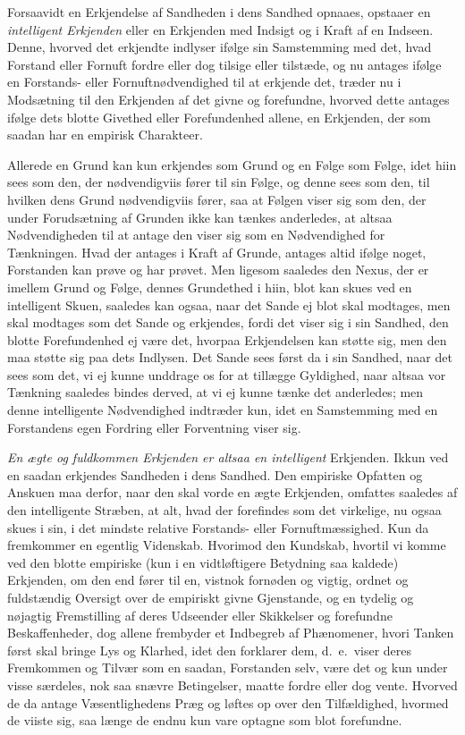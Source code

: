 \documentclass[12pt,a4paper]{book}
\newcommand{\apage}[1]{\marginnote{\footnotesize\textit{[#1]}}}
\begin{document}
Forsaavidt en Erkjendelse af Sandheden i dens Sandhed opnaaes, opstaaer en
\emph{intelligent Erkjenden} eller en Erkjenden med Indsigt og i Kraft af en
Indseen. Denne, hvorved det erkjendte indlyser ifølge sin Samstemming med det,
hvad Forstand eller Fornuft fordre eller dog tilsige eller tilstæde, og nu antages
ifølge en Forstands- eller Fornuftnødvendighed til at erkjende det, træder nu i
Modsætning til den Erkjenden af det givne og forefundne, hvorved dette antages
ifølge dets blotte Givethed eller Forefundenhed allene, en Erkjenden, der som
saadan har en empirisk Charakteer.

Allerede en Grund kan kun erkjendes som Grund \apage{56}  og en Følge som Følge, idet hiin
sees som den, der nødvendigviis fører til sin Følge, og denne sees som den, til
hvilken dens Grund nødvendigviis fører, saa at Følgen viser sig som den, der under
Forudsætning af Grunden ikke kan tænkes anderledes, at altsaa Nødvendigheden til
at antage den viser sig som en Nødvendighed for Tænkningen. Hvad der antages i
Kraft af Grunde, antages altid ifølge noget, Forstanden kan prøve og har prøvet.
Men ligesom saaledes den Nexus, der er imellem Grund og Følge, dennes Grundethed
i hiin, blot kan skues ved en intelligent Skuen, saaledes kan ogsaa, naar det
Sande ej blot skal modtages, men skal modtages som det Sande og erkjendes, fordi
det viser sig i sin Sandhed, den blotte Forefundenhed ej være det, hvorpaa
Erkjendelsen kan støtte sig, men den maa støtte sig paa dets Indlysen. Det Sande
sees først da i sin Sandhed, naar det sees som det, vi ej kunne unddrage os for
at tillægge Gyldighed, naar altsaa vor Tænkning saaledes bindes derved, at vi ej
kunne tænke det anderledes; men denne intelligente Nødvendighed indtræder kun,
idet en Samstemming med en Forstandens egen Fordring eller Forventning viser sig.

\emph{En ægte og fuldkommen Erkjenden er altsaa en intelligent} Erkjenden. Ikkun
ved en saadan erkjendes Sandheden i dens Sandhed. Den empiriske Opfatten og
Anskuen maa derfor, naar  \apage{57} den skal vorde en ægte Erkjenden, omfattes saaledes af
den intelligente Stræben, at alt, hvad der forefindes som det virkelige, nu ogsaa
skues i sin, i det mindste relative Forstands- eller Fornuftmæssighed. Kun da
fremkommer en egentlig Videnskab. Hvorimod den Kundskab, hvortil vi komme ved den
blotte empiriske (kun i en vidtløftigere Betydning saa kaldede) Erkjenden, om den
end fører til en, vistnok fornøden og vigtig, ordnet og fuldstændig Oversigt over
de empiriskt givne Gjenstande, og en tydelig og nøjagtig Fremstilling af deres
Udseender eller Skikkelser og forefundne Beskaffenheder, dog allene frembyder et
Indbegreb af Phænomener, hvori Tanken først skal bringe Lys og Klarhed, idet den
forklarer dem, d.\ e.\ viser deres Fremkommen og Tilvær som en saadan, Forstanden
selv, være det og kun under visse særdeles, nok saa snævre Betingelser, maatte
fordre eller dog vente. Hvorved de da antage Væsentlighedens Præg og løftes op
over den Tilfældighed, hvormed de viiste sig, saa længe de endnu kun vare optagne
som blot forefundne.
\end{document}
